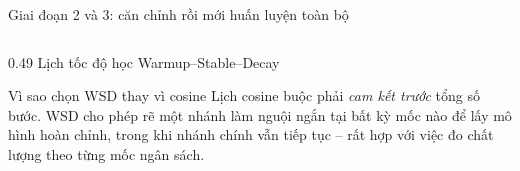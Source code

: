 \begin{frame}{Giai đoạn 2 và 3: căn chỉnh rồi mới huấn luyện toàn bộ}
\begin{columns}[T]
\begin{column}{0.49\textwidth}
\vspace{2pt}
{\footnotesize\color{vnCite} Lịch tốc độ học Warmup--Stable--Decay
 \citep{Hu2024}}

\vspace{0.3em}
\begin{block}{Vì sao chọn WSD thay vì cosine}
  \small Lịch cosine buộc phải \emph{cam kết trước} tổng số bước. WSD cho phép
  rẽ một nhánh làm nguội ngắn tại bất kỳ mốc nào để lấy mô hình hoàn chỉnh,
  trong khi nhánh chính vẫn tiếp tục -- rất hợp với việc đo chất lượng theo
  từng mốc ngân sách.
\end{block}
\end{column}
\end{columns}
\end{frame}

